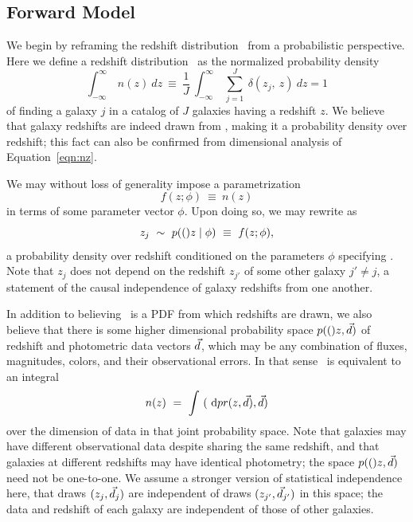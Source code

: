 \subsection{Forward Model}

We begin by reframing the redshift distribution \nz\ from a probabilistic perspective.
Here we define a redshift distribution \nz\ as the normalized probability density
\begin{equation}
\label{eqn:nz}
\int_{-\infty}^{\infty}\ n(z)\ dz\ \equiv\ \frac{1}{J}\ \int_{-\infty}^{\infty}\ \sum_{j=1}^{J}\ \delta(z_{j},\ z)\ dz = 1
\end{equation}
of finding a galaxy $j$ in a catalog of $J$ galaxies having a redshift $z$.
We believe that galaxy redshifts are indeed drawn from \nz, making it a probability density over redshift; this fact can also be confirmed from dimensional analysis of Equation~\ref{eqn:nz}.

We may without loss of generality impose a parametrization
\begin{equation}
\label{eqn:fz}
f(z; \phi)\ \equiv\ n(z)
\end{equation}
in terms of some parameter vector $\phi$.
Upon doing so, we may rewrite  as 
\begin{equation}
\label{eqn:pz}
z_{j}\ \sim\ p(()z \mid \phi)\ \equiv\ f(z; \phi),
\end{equation}
a probability density over redshift conditioned on the parameters $\phi$ specifying \nz.
Note that $z_{j}$ does not depend on the redshift $z_{j'}$ of some other galaxy $j' \neq j$, a statement of the causal independence of galaxy redshifts from one another.

In addition to believing \nz\ is a PDF from which redshifts are drawn, we also believe that there is some higher dimensional probability space $p(()z, \vec{d})$ of redshift and photometric data vectors $\vec{d}$, which may be any combination of fluxes, magnitudes, colors, and their observational errors.
In that sense \nz\ is equivalent to an integral
\begin{equation}
\label{eqn:integral}
n(z)\ =\ \int\ (\ \mathrm{d} pr(z, \vec{d}), \vec{d})
\end{equation}
over the dimension of data in that joint probability space.
Note that galaxies may have different observational data despite sharing the same redshift, and that galaxies at different redshifts may have identical photometry; the space $p(()z, \vec{d})$ need not be one-to-one.
We assume a stronger version of statistical independence here, that draws $(z_{j}, \vec{d}_{j})$ are independent of draws $(z_{j'}, \vec{d}_{j'})$ in this space; the data and redshift of each galaxy are independent of those of other galaxies.

